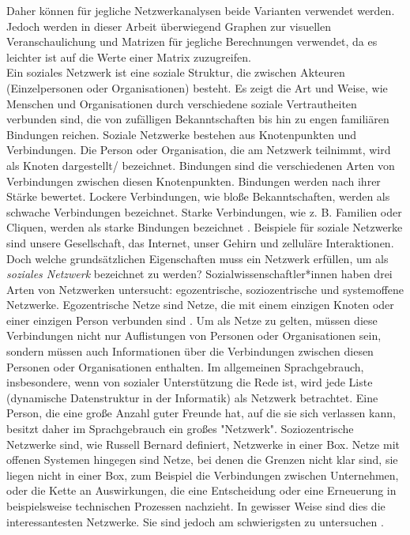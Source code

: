 Daher können für jegliche Netzwerkanalysen beide Varianten verwendet werden. Jedoch werden in dieser Arbeit überwiegend Graphen zur visuellen Veranschaulichung und Matrizen für jegliche Berechnungen verwendet, da es leichter ist auf die Werte einer Matrix zuzugreifen.\\

Ein soziales Netzwerk ist eine soziale Struktur, die zwischen Akteuren (Einzelpersonen oder Organisationen) besteht. Es zeigt die Art und Weise, wie Menschen und Organisationen durch verschiedene soziale Vertrautheiten verbunden sind, die von zufälligen Bekanntschaften bis hin zu engen familiären Bindungen reichen. Soziale Netzwerke bestehen aus Knotenpunkten und Verbindungen. Die Person oder Organisation, die am Netzwerk teilnimmt, wird als Knoten dargestellt/ bezeichnet. Bindungen sind die verschiedenen Arten von Verbindungen zwischen diesen Knotenpunkten. Bindungen werden nach ihrer Stärke bewertet. Lockere Verbindungen, wie bloße Bekanntschaften, werden als schwache Verbindungen bezeichnet. Starke Verbindungen, wie z. B. Familien oder Cliquen, werden als starke Bindungen bezeichnet \cite{SNADefinition}. Beispiele für soziale Netzwerke sind unsere Gesellschaft, das Internet, unser Gehirn und zelluläre Interaktionen.
Doch welche grundsätzlichen Eigenschaften muss ein Netzwerk erfüllen, um als \textit{soziales Netzwerk} bezeichnet zu werden? 
Sozialwissenschaftler*innen haben drei Arten von Netzwerken untersucht: egozentrische, soziozentrische und systemoffene
Netzwerke. Egozentrische Netze sind Netze, die mit einem einzigen Knoten oder einer einzigen Person verbunden sind \cite{egocentric}. Um als Netze zu gelten, müssen diese Verbindungen nicht nur Auflistungen von Personen oder Organisationen sein, sondern müssen auch Informationen über die Verbindungen zwischen diesen Personen oder Organisationen enthalten. Im allgemeinen Sprachgebrauch, insbesondere, wenn von sozialer Unterstützung die Rede ist, wird jede Liste (dynamische Datenstruktur in der Informatik) als Netzwerk betrachtet. Eine Person, die eine große Anzahl guter Freunde hat, auf die sie sich verlassen kann, besitzt daher im Sprachgebrauch ein großes "Netzwerk". Soziozentrische Netzwerke sind, wie Russell Bernard definiert, Netzwerke in einer Box. Netze mit offenen Systemen hingegen sind Netze, bei denen die Grenzen nicht klar sind, sie liegen nicht in einer Box, zum Beispiel die Verbindungen zwischen Unternehmen, oder die Kette an Auswirkungen, die eine Entscheidung oder eine Erneuerung in beispielsweise technischen Prozessen nachzieht. In gewisser Weise sind dies die interessantesten Netzwerke. Sie sind jedoch am schwierigsten zu untersuchen \cite{charlesKadushin}. 




